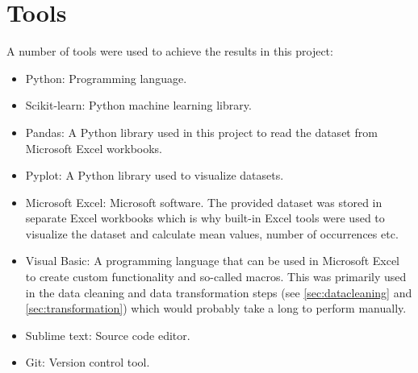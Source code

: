 \section{Tools}
	A number of tools were used to achieve the results in this project:
	\begin{itemize}
		\item{Python: } Programming language.
		\item{Scikit-learn: } Python machine learning library. 
		\item{Pandas: } A Python library used in this project to read the dataset from Microsoft Excel workbooks.
		\item{Pyplot: } A Python library used to visualize datasets.
		\item{Microsoft Excel: } Microsoft software. The provided dataset was stored in separate Excel workbooks which is why built-in Excel tools were used to visualize the dataset and calculate mean values, number of occurrences etc.
		\item{Visual Basic: } A programming language that can be used in Microsoft Excel to create custom functionality and so-called macros. This was primarily used in the data cleaning and data transformation steps (see \ref{sec:datacleaning} and \ref{sec:transformation}) which would probably take a long to perform manually.
		\item{Sublime text: } Source code editor.
		\item{Git: } Version control tool. 
	\end{itemize}




